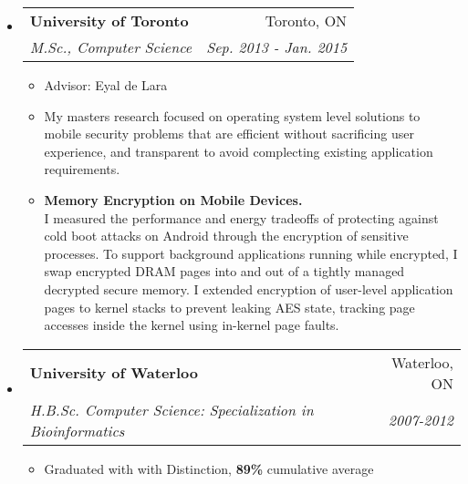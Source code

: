 \documentclass[letterpaper,11pt]{article}
\makeatletter
\newcommand{\BulletZeroLeftMargin}{1.5em}
\newcommand{\company}[1]{%
    \textbf{#1}
}
\newcommand{\resitem}[1]{\item #1 \vspace{-2pt}}
\newcommand{\ressubheading}[4]{
\begin{tabular*}{6.5in}{l@{\extracolsep{\fill}}r}
    
		\company{#1} & #2 \\
		\textit{#3} & \textit{#4} \\
\end{tabular*}\vspace{-6pt}}
\newcommand{\mscphdheading}[6]{
\begin{tabular*}{6.5in}{l@{\extracolsep{\fill}}r}
    
		\company{#1} & #2 \\
		\textit{#3} & \textit{#4} \\
		\textit{#5} & \textit{#6} \\
\end{tabular*}\vspace{-6pt}}
\makeatother
\begin{document}
\begin{itemize}[leftmargin=\BulletZeroLeftMargin]
\item
\ressubheading{University of Toronto}{Toronto, ON}{M.Sc., Computer Science}{Sep. 2013 - Jan. 2015}
    \begin{itemize}[leftmargin=\BulletZeroLeftMargin]
		\resitem{Advisor: Eyal de Lara}
        \resitem{
            My masters research focused on operating system
            level solutions to mobile security problems that are efficient without 
            sacrificing user experience, and transparent to avoid complecting existing 
            application requirements.
        }
        \resitem{
            \textbf{Memory Encryption on Mobile Devices.} \\
            I measured the performance and energy tradeoffs of protecting against 
            cold boot attacks on Android through the encryption of sensitive processes.  To 
            support background applications running while encrypted, I swap encrypted DRAM 
            pages into and out of a tightly managed decrypted secure memory.
            I extended encryption of user-level application pages to kernel stacks 
            to prevent leaking AES state, tracking page accesses inside the kernel using 
            in-kernel page faults.
        }
	\end{itemize}

\item
	\ressubheading{University of Waterloo}{Waterloo, ON}{H.B.Sc. Computer Science: Specialization in Bioinformatics}{2007-2012}
    \begin{itemize}[leftmargin=\BulletZeroLeftMargin]
		\resitem{Graduated with with Distinction, \textbf{89\%} cumulative average}
	\end{itemize}

\end{itemize}
\end{document}
